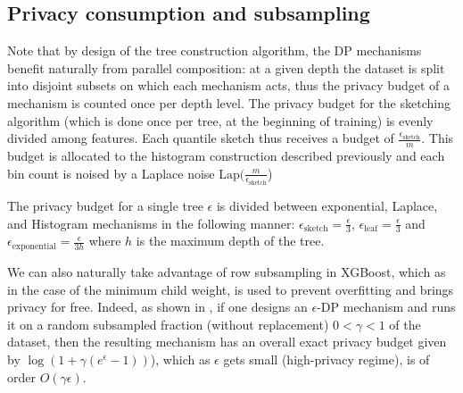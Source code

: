 \documentclass{article}
\theoremstyle{definition}
\begin{document}
\subsection{Privacy consumption and subsampling} 

Note that by design of the tree construction algorithm, the DP mechanisms benefit naturally from parallel composition: at a given depth the dataset is split into disjoint subsets on which each mechanism acts, thus the privacy budget of a mechanism is counted once per depth level. The privacy budget for the sketching algorithm (which is done once per tree, at the beginning of training) is evenly divided among features. Each quantile sketch thus receives a budget of $ \frac{ \epsilon_{\text{sketch}} }{m}$. This budget is allocated to the histogram construction described previously and each bin count is noised by a Laplace noise $\text{Lap}( \frac{m}{\epsilon_{\text{sketch}}}$) 

The privacy budget for a single tree $\epsilon$ is divided between exponential, Laplace, and Histogram mechanisms in the following manner: $\epsilon_{\text{sketch}} = \frac{\epsilon}{3}$, $\epsilon_{\text{leaf}} = \frac{\epsilon}{3}$ and $\epsilon_{\text{exponential}} = \frac{\epsilon}{3 h}$ where $h$ is the maximum depth of the tree. 

We can also naturally take advantage of row subsampling in XGBoost, which as in the case of the minimum child weight, is used to prevent overfitting and brings privacy for free. Indeed, as shown in \cite{balle2018subsampling}, if one designs an $\epsilon$-DP mechanism and runs it on a random subsampled fraction (without replacement) $0 < \gamma < 1$ of the dataset, then the resulting mechanism has an overall exact privacy budget given by $\log\left(1 + \gamma(e^{\epsilon} - 1)\right)$), which as $\epsilon$ gets small (high-privacy regime), is of order $O(\gamma \epsilon)$.  

\end{document}
